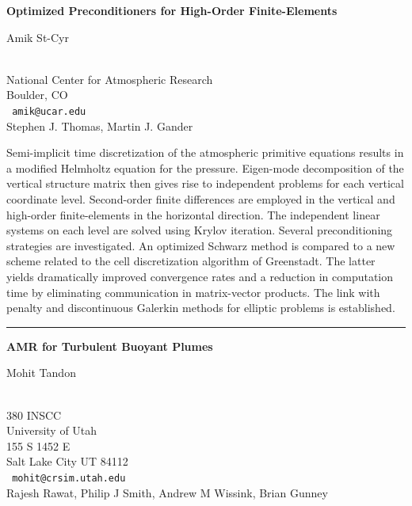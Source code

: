 \documentclass[twosided]{report}
\begin{document}
\begin{center}
{\large			\label{stcyr}
{\bf
Optimized Preconditioners for High-Order Finite-Elements
}

Amik St-Cyr} \\
National Center for Atmospheric Research \\ Boulder, CO
\\ {\tt
amik@ucar.edu
}
\\

Stephen J. Thomas,
Martin J. Gander
\end{center}

Semi-implicit time discretization of the atmospheric primitive
equations results in a modified Helmholtz equation for the pressure.
Eigen-mode decomposition of the vertical structure matrix then gives
rise to independent problems for each vertical coordinate level.
Second-order finite differences are employed in the vertical and
high-order finite-elements in the horizontal direction. The independent
linear systems on each level are solved using Krylov iteration. Several
preconditioning strategies are investigated. An optimized Schwarz
method is compared to a new scheme related to the cell discretization
algorithm of Greenstadt. The latter yields dramatically improved
convergence rates and a reduction in computation time by eliminating
communication in matrix-vector products. The link with penalty and
discontinuous Galerkin methods for elliptic problems is established.

\begin{center}

\rule{6in}{1pt}
\end{center}

\begin{center}
{\large			\label{tandon}
{\bf
AMR for Turbulent Buoyant Plumes
}

Mohit Tandon} \\
380 INSCC \\
University of Utah \\
155 S 1452 E \\
Salt Lake City UT 84112
\\ {\tt
mohit@crsim.utah.edu
}
\\
Rajesh Rawat,
Philip J Smith,
Andrew M Wissink,
Brian Gunney
\end{center}
\end{document}

